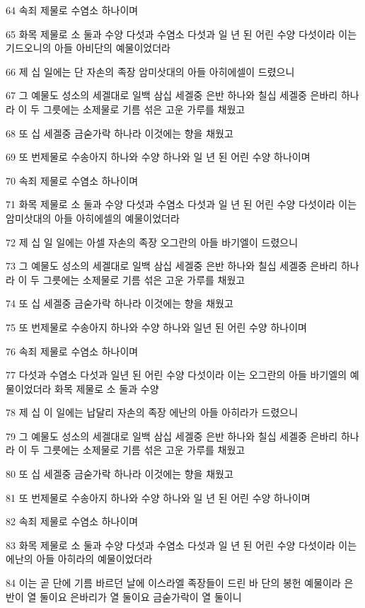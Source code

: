 \par 64 속죄 제물로 수염소 하나이며
\par 65 화목 제물로 소 둘과 수양 다섯과 수염소 다섯과 일 년 된 어린 수양 다섯이라 이는 기드오니의 아들 아비단의 예물이었더라
\par 66 제 십 일에는 단 자손의 족장 암미삿대의 아들 아히에셀이 드렸으니
\par 67 그 예물도 성소의 세겔대로 일백 삼십 세겔중 은반 하나와 칠십 세겔중 은바리 하나라 이 두 그릇에는 소제물로 기름 섞은 고운 가루를 채웠고
\par 68 또 십 세겔중 금숟가락 하나라 이것에는 향을 채웠고
\par 69 또 번제물로 수송아지 하나와 수양 하나와 일 년 된 어린 수양 하나이며
\par 70 속죄 제물로 수염소 하나이며
\par 71 화목 제물로 소 둘과 수양 다섯과 수염소 다섯과 일 년 된 어린 수양 다섯이라 이는 암미삿대의 아들 아히에셀의 예물이었더라
\par 72 제 십 일 일에는 아셀 자손의 족장 오그란의 아들 바기엘이 드렸으니
\par 73 그 예물도 성소의 세겔대로 일백 삼십 세겔중 은반 하나와 칠십 세겔중 은바리 하나라 이 두 그릇에는 소제물로 기름 섞은 고운 가루를 채웠고
\par 74 또 십 세겔중 금숟가락 하나라 이것에는 향을 채웠고
\par 75 또 번제물로 수송아지 하나와 수양 하나와 일년 된 어린 수양 하나이며
\par 76 속죄 제물로 수염소 하나이며
\par 77 다섯과 수염소 다섯과 일년 된 어린 수양 다섯이라 이는 오그란의 아들 바기엘의 예물이었더라 화목 제물로 소 둘과 수양
\par 78 제 십 이 일에는 납달리 자손의 족장 에난의 아들 아히라가 드렸으니
\par 79 그 예물도 성소의 세겔대로 일백 삼십 세겔중 은반 하나와 칠십 세겔중 은바리 하나라 이 두 그릇에는 소제물로 기름 섞은 고운 가루를 채웠고
\par 80 또 십 세겔중 금숟가락 하나라 이것에는 향을 채웠고
\par 81 또 번제물로 수송아지 하나와 수양 하나와 일 년 된 어린 수양 하나이며
\par 82 속죄 제물로 수염소 하나이며
\par 83 화목 제물로 소 둘과 수양 다섯과 수염소 다섯과 일 년 된 어린 수양 다섯이라 이는 에난의 아들 아히라의 예물이었더라
\par 84 이는 곧 단에 기름 바르던 날에 이스라엘 족장들이 드린 바 단의 봉헌 예물이라 은반이 열 둘이요 은바리가 열 둘이요 금숟가락이 열 둘이니
